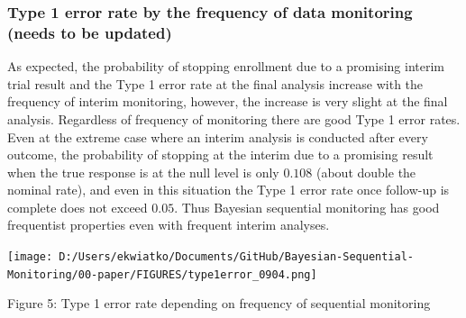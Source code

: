 \documentclass[12pt]{article}
\begin{document}
\subsubsection{Type 1 error rate by the frequency of data monitoring (needs to be updated)}
As expected, the probability of stopping enrollment due to a promising interim trial result and the Type 1 error rate at the final analysis increase with the frequency of interim monitoring, however, the increase is very slight at the final analysis. Regardless of frequency of monitoring there are good Type 1 error rates. Even at the extreme case where an interim analysis is conducted after every outcome, the probability of stopping at the interim due to a promising result when the true response is at the null level is only $0.108$ (about double the nominal rate), and even in this situation the Type 1 error rate once follow-up is complete does not exceed $0.05$. Thus Bayesian sequential monitoring has good frequentist properties even with frequent interim analyses.
\begin{center}
\texttt{[image: D:/Users/ekwiatko/Documents/GitHub/Bayesian-Sequential-Monitoring/00-paper/FIGURES/type1error\_0904.png]}

Figure 5: Type 1 error rate depending on frequency of sequential monitoring
\end{center}
\end{document}
